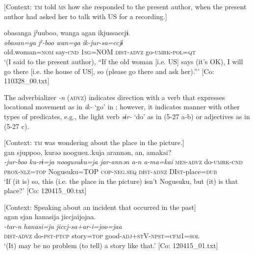 \ea \label{ex:5:26}   [Context: \textsc{tm} told \textsc{ms} how she responded to the present author, when the present author had asked her to talk with US for a recording.]

\glll  {\textbar}obasan{\textbar}ga  jˀuuboo,  wanga  agan  ikjussaccjɨ.\\
\textit{obasan=ga}  \textit{jˀ-boo}  \textit{wan=ga}  \textit{}  \textit{ik-jur-sa=ccjɨ}\\
old.woman=\textsc{nom}  say-\textsc{cnd}  1\textsc{sg}=NOM  \textsc{dist}-\textsc{advz}  go-\textsc{umrk}-\textsc{pol}=\textsc{qt}\\
\glt ‘(I said to the present author), “If the old woman [i.e. US] says (it’s OK), I will go there [i.e. the house of US], so (please go there and ask her).”’ [Co: 110328\_00.txt]
\z

The adverbializer \textit{{}-n} (\textsc{advz}) indicates direction with a verb that expresses locational movement as in \textit{ik-} ‘go’ in ; however, it indicates manner with other types of predicates, e.g., the light verb \textit{sɨr-} ‘do’ as in (5-27 a-b) or adjectives as in (5-27 c).

\ea \label{ex:5:27}  \ea \label{ex:5:27a} [Context: \textsc{tm} was wondering about the place in the picture.]\\
\gll  gan  sjuppoo,  kurəə  noogusu..kuja   arannən,  an,  amakai?\\
      \textit{}  \textit{-jur-boo}  \textit{ku-rɨ=ja}  \textit{noogusuku=ja} \textit{jar-annən}  \textit{a-n}  \textit{a-ma=kai}
      \textsc{mes}-\textsc{advz}  do-\textsc{umrk}-\textsc{cnd}  \textsc{prox}-\textsc{nlz}=\textsc{top}  Nogusuku=TOP  \textsc{cop}-\textsc{neg}.\textsc{seq}  \textsc{dist}-\textsc{adnz}  DI\textsc{st}-place=\textsc{dub}\\
\glt ‘If (it is) so, this (i.e. the place in the picture) isn’t Nogusuku, but (it) is that place?’  [Co: 120415\_00.txt]

 \ex \label{ex:5:b} [Context: Speaking about an incident that occurred in the past]\\
\glll  agan  sjan  hanasija  jiccjaijojaa.\\
\textit{}  \textit{-tar-n}  \textit{hanasi=ja}  \textit{jiccj-sa+ar-i=joo=jaa}\\
\textsc{dist}-\textsc{advz}  do-\textsc{pst}-\textsc{ptcp}  story=\textsc{top}  good-\textsc{adj}+\textsc{st}V-\textsc{npst}=\textsc{cfm}1=\textsc{sol}\\
\glt ‘(It) may be no problem (to tell) a story like that.’ [Co: 120415\_01.txt]

